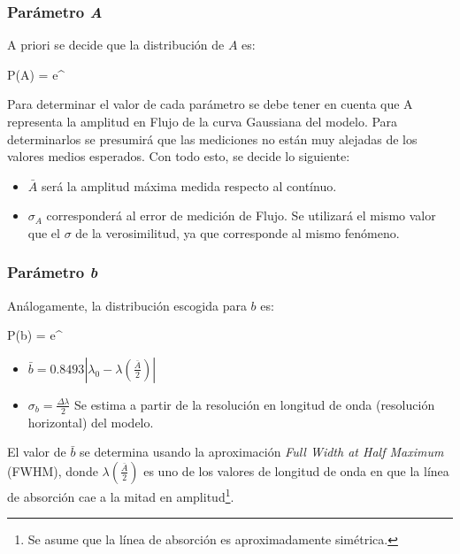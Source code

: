 \documentclass{article}
\begin{document}
\subsubsection{Parámetro \emph{A}}

A priori se decide que la distribución de $A$ es:

\begin{myequation}
P(A) =  e^{}
\label{ec:distr_A}
\end{myequation}

Para determinar el valor de cada parámetro se debe tener en cuenta que A representa la amplitud en Flujo de la curva Gaussiana del modelo. Para determinarlos se presumirá que las mediciones no están muy alejadas de los valores medios esperados. Con todo esto, se decide lo siguiente:

\begin{itemize}
\item $\bar A$ será la amplitud máxima medida respecto al contínuo.

\item $\sigma_A$ corresponderá al error de medición de Flujo. Se utilizará el mismo valor que el $\sigma$ de la verosimilitud, ya que corresponde al mismo fenómeno.
\end{itemize}

\subsubsection{Parámetro \emph{b}}
Análogamente, la distribución escogida para $b$ es:

\begin{myequation}
P(b) =  e^{}
\end{myequation}

\begin{itemize}
\item $\bar b = 0.8493|\lambda_0 - \lambda(\frac{\bar A}{2})|$

\item $\sigma_b = \frac{\Delta \lambda}{2}$ Se estima a partir de la resolución en longitud de onda (resolución horizontal) del modelo.
\end{itemize}

El valor de $\bar b$ se determina usando la aproximación \emph{Full Width at Half Maximum} (FWHM), donde $\lambda(\frac{\bar A}{2})$ es uno de los valores de longitud de onda en que la línea de absorción cae a la mitad en amplitud\footnote{ Se asume que la línea de absorción es aproximadamente simétrica.}.
\end{document}

